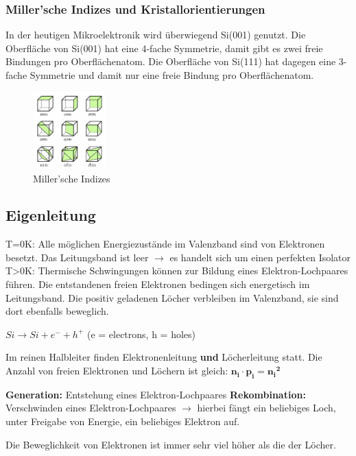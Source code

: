 		
	\subsubsection{Miller'sche Indizes und Kristallorientierungen}
	
		In der heutigen Mikroelektronik wird überwiegend Si(001) genutzt.
		Die Oberfläche von Si(001) hat eine 4-fache Symmetrie, damit gibt es zwei freie Bindungen pro Oberflächenatom.
		Die Oberfläche von Si(111) hat dagegen eine 3-fache Symmetrie und damit nur eine freie Bindung pro Oberflächenatom.
		
		\begin{figure}[h]
			\centering
			\includegraphics[width=0.25\textwidth]{Kapitel/Kap02/millerscheIndizes.PNG}
			\caption{Miller'sche Indizes}
			\label{02_millInd}
		\end{figure}
	
\subsection{Eigenleitung}
	T=0K: Alle möglichen Energiezustände im Valenzband sind von Elektronen besetzt. Das Leitungsband ist leer $\rightarrow$ es handelt sich um einen perfekten Isolator
	T>0K: Thermische Schwingungen können zur Bildung eines Elektron-Lochpaares führen. Die entstandenen freien Elektronen bedingen sich energetisch im Leitungsband. Die positiv geladenen Löcher verbleiben im Valenzband, sie sind dort ebenfalls beweglich.
	
	$Si \longrightarrow Si + e^- + h^+$ (e = electrons, h = holes)
	
	Im reinen Halbleiter finden Elektronenleitung \textbf{und} Löcherleitung statt. Die Anzahl von freien Elektronen und Löchern ist gleich: $\mathbf{n_i \cdot{p_i} = {n_i}^2}$
	
	\textbf{Generation:} Entstehung eines Elektron-Lochpaares
	\textbf{Rekombination:} Verschwinden eines Elektron-Lochpaares
	$\rightarrow$ hierbei fängt ein beliebiges Loch, unter Freigabe von Energie, ein beliebiges Elektron auf.
	
	Die Beweglichkeit von Elektronen ist immer sehr viel höher als die der Löcher.
